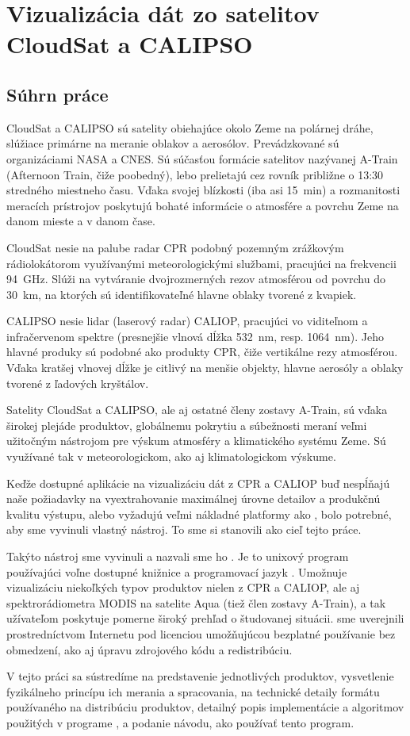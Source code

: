 


\chapter*{Vizualizácia dát zo satelitov CloudSat a CALIPSO}
\section*{\LARGE Súhrn práce}
CloudSat a CALIPSO sú satelity obiehajúce okolo Zeme na polárnej dráhe, slúžiace
primárne na meranie oblakov a aerosólov. Prevádzkované sú organizáciami NASA a
CNES. 
Sú súčasťou formácie satelitov
nazývanej A-Train (Afternoon Train, čiže poobedný), lebo prelietajú cez rovník
približne o 13:30 stredného miestneho času. Vďaka svojej blízkosti (iba asi
\SI{15}{min}) a rozmanitosti meracích prístrojov poskytujú bohaté informácie o
atmosfére a povrchu Zeme na danom mieste a v danom čase.

CloudSat nesie na palube radar CPR podobný pozemným zrážkovým rádiolokátorom
využívanými meteorologickými službami, pracujúci na frekvencii \SI{94}{GHz}. Slúži na
vytvára\-nie dvojrozmerných rezov atmosférou od povrchu do \SI{30}{km}, na ktorých sú
identifikovateľné hlavne oblaky tvorené z kvapiek.

CALIPSO nesie lidar (laserový radar) CALIOP, pracujúci vo viditeľnom a
infračervenom spektre (presnejšie vlnová dĺžka \SI{532}{nm}, resp. \SI{1064}{nm}). Jeho hlavné
produky sú podobné ako produkty CPR, čiže vertikálne rezy atmosférou. Vďaka
kratšej vlnovej dĺžke je citlivý na menšie objekty, hlavne aerosóly a oblaky
tvorené z ľadových kryštálov.

Satelity CloudSat a CALIPSO, ale aj ostatné členy zostavy A-Train, sú vďaka
širokej plejáde produktov, globálnemu pokrytiu a súbežnosti meraní veľmi
užitočným nástrojom pre výskum atmosféry a klimatického systému Zeme. Sú
využívané tak v meteorologickom, ako aj klimatologickom výskume.

Keďže dostupné aplikácie na vizualizáciu dát z CPR a CALIOP buď nespĺňajú naše
požiadavky na vyextrahovanie maximálnej úrovne detailov a produkčnú kvalitu
výstupu, alebo vyžadujú veľmi nákladné platformy ako , bolo
potrebné, aby sme vyvinuli vlastný nástroj. To sme si stanovili ako cieľ tejto práce.

Takýto nástroj sme vyvinuli a nazvali sme ho \ccplot. Je to
unixový program používajúci voľne dostupné knižnice a programovací jazyk
. Umožnuje vizualizáciu niekoľkých typov produktov nielen z CPR
a CALIOP, ale aj spektrorádiometra MODIS na satelite Aqua (tiež člen zostavy
A-Train), a tak užívateľom poskytuje pomerne široký prehľad o študovanej
situácii. \ccplot sme uverejnili prostredníctvom Internetu pod licenciou umožňujúcou
bezplatné používanie bez obmedzení, ako aj úpravu zdrojového kódu a redistribúciu.

V tejto práci sa sústredíme na predstavenie jednotlivých produktov,
vysvetlenie fyzikálneho princípu ich merania a spracovania, na technické detaily formátu
používaného na distribúciu produktov, detailný popis implementácie a algoritmov
použitých v programe \ccplot, a podanie návodu, ako používať tento program.
